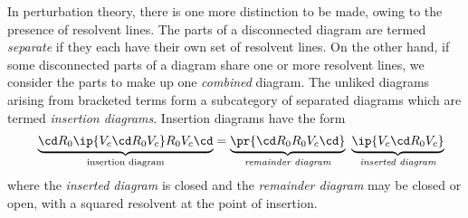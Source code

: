 \documentclass[11pt,fleqn]{article}
\numberwithin{equation}{section}
\begin{document}
\begin{dfn}
In perturbation theory, there is one more distinction to be made, owing to the presence of resolvent lines.
The parts of a disconnected diagram are termed \textit{separate} if they each have their own set of resolvent lines.
On the other hand, if some disconnected parts of a diagram share one or more resolvent lines, we consider the parts to make up one \textit{combined} diagram. 
The unliked diagrams arising from bracketed terms form a subcategory of separated diagrams which are termed \textit{insertion diagrams}.
Insertion diagrams have the form
\begin{align*}
&&
  \underset{
    \text{insertion diagram}
  }{\underbrace{
    \cd R_0\ip{V_c\cd R_0V_c}R_0V_c\cd 
  }}
=
  \underset{
    \textit{remainder diagram}
  }{\underbrace{
    \pr{
      \cd R_0R_0V_c\cd
    }
  }}\hspace{5pt}
  \underset{
    \textit{inserted diagram}
  }{\underbrace{
    \ip{V_c\cd R_0V_c}
  }}
\end{align*}
where the \textit{inserted diagram} is closed and the \textit{remainder diagram} may be closed or open, with a squared resolvent at the point of insertion.
\end{dfn}
\end{document}
